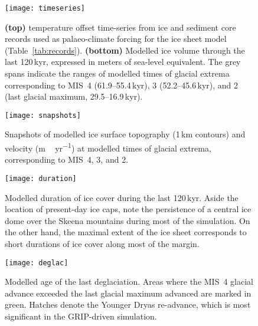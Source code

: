 \documentclass[tc, ms]{copernicus}
\begin{document}
\begin{figure}
  \texttt{[image: timeseries]}
  \caption{\textbf{(top)} temperature offset time-series from ice and sediment
           core records used as palaeo-climate forcing for the ice sheet model
           (Table~\ref{tab:records}). \textbf{(bottom)} Modelled ice volume
           through the last 120\,\unit{kyr}, expressed in meters of sea-level
           equivalent. The grey spans indicate the ranges of modelled times of
           glacial extrema corresponding to MIS~4 (61.9--55.4\,\unit{kyr}), 3
           (52.2--45.6\,\unit{kyr}), and 2 (last glacial maximum,
           29.5--16.9\,\unit{kyr}).}
  \label{fig:timeseries}
\end{figure}

\begin{figure}
  \texttt{[image: snapshots]}
  \caption{Snapshots of modelled ice surface topography (1\,\unit{km} contours)
           and velocity (\unit{m\,yr^{-1}}) at modelled times of glacial
           extrema, corresponding to MIS~4, 3, and 2.}
  \label{fig:snapshots}
\end{figure}

\begin{figure}
  \texttt{[image: duration]}
  \caption{Modelled duration of ice cover during the last 120\,\unit{kyr}.
           Aside the location of present-day ice caps, note the persistence of
           a central ice dome over the Skeena mountains during most of the
           simulation. On the other hand, the maximal extent of the ice sheet
           corresponds to short durations of ice cover along most of the margin.}
  \label{fig:duration}
\end{figure}

\begin{figure}
  \texttt{[image: deglac]}
  \caption{Modelled age of the last deglaciation. Areas where the MIS~4 glacial
           advance exceeded the last glacial maximum advanced are marked in
           green. Hatches denote the Younger Dryas re-advance, which is most
           significant in the GRIP-driven simulation.}
  \label{fig:deglac}
\end{figure}

\end{document}
